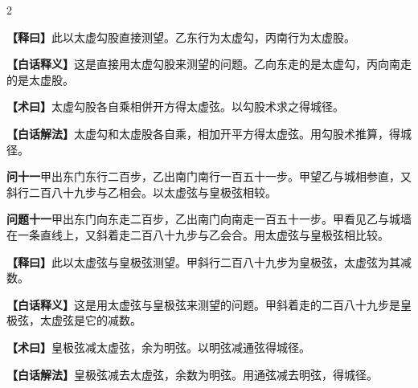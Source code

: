 \documentclass[11pt,a4paper]{article}
\newcommand{\WenQuestion}[1]{\textbf{\textcolor{classicalcolor}{#1}}}
\newcommand{\BaiQuestion}[1]{\textbf{\textcolor{moderncolor}{#1}}}
\newcommand{\WenExplain}{\textcolor{classicalcolor}{\textbf{【释曰】}}}
\newcommand{\BaiExplain}{\textcolor{moderncolor}{\textbf{【白话释义】}}}
\newcommand{\WenMethod}{\textcolor{classicalcolor}{\textbf{【术曰】}}}
\newcommand{\BaiMethod}{\textcolor{moderncolor}{\textbf{【白话解法】}}}
\begin{document}
\begin{paracol}{2}
\switchcolumn*
\begin{tcolorbox}[colback=red!5,colframe=red!30!black,boxrule=0.3pt]
\WenExplain\quad 此以太虚勾股直接测望。乙东行为太虚勾，丙南行为太虚股。
\end{tcolorbox}
\switchcolumn
\begin{tcolorbox}[colback=blue!5,colframe=blue!30!black,boxrule=0.3pt]
\BaiExplain\quad 这是直接用太虚勾股来测望的问题。乙向东走的是太虚勾，丙向南走的是太虚股。
\end{tcolorbox}

\switchcolumn*
\begin{tcolorbox}[colback=red!5,colframe=red!40!black,boxrule=0.3pt]
\WenMethod\quad 太虚勾股各自乘相併开方得太虚弦。以勾股术求之得城径。
\end{tcolorbox}
\switchcolumn
\begin{tcolorbox}[colback=blue!5,colframe=blue!40!black,boxrule=0.3pt]
\BaiMethod\quad 太虚勾和太虚股各自乘，相加开平方得太虚弦。用勾股术推算，得城径。
\end{tcolorbox}

\vspace{0.8em}

\switchcolumn*
\begin{tcolorbox}[colback=red!3,colframe=red!30!black,boxrule=0.3pt]
\WenQuestion{问十一}\quad 甲出东门东行二百步，乙出南门南行一百五十一步。甲望乙与城相参直，又斜行二百八十九步与乙相会。以太虚弦与皇极弦相较。
\end{tcolorbox}
\switchcolumn
\begin{tcolorbox}[colback=blue!3,colframe=blue!30!black,boxrule=0.3pt]
\BaiQuestion{问题十一}\quad 甲出东门向东走二百步，乙出南门向南走一百五十一步。甲看见乙与城墙在一条直线上，又斜着走二百八十九步与乙会合。用太虚弦与皇极弦相比较。
\end{tcolorbox}

\switchcolumn*
\begin{tcolorbox}[colback=red!5,colframe=red!30!black,boxrule=0.3pt]
\WenExplain\quad 此以太虚弦与皇极弦测望。甲斜行二百八十九步为皇极弦，太虚弦为其减数。
\end{tcolorbox}
\switchcolumn
\begin{tcolorbox}[colback=blue!5,colframe=blue!30!black,boxrule=0.3pt]
\BaiExplain\quad 这是用太虚弦与皇极弦来测望的问题。甲斜着走的二百八十九步是皇极弦，太虚弦是它的减数。
\end{tcolorbox}

\switchcolumn*
\begin{tcolorbox}[colback=red!5,colframe=red!40!black,boxrule=0.3pt]
\WenMethod\quad 皇极弦减太虚弦，余为明弦。以明弦减通弦得城径。
\end{tcolorbox}
\switchcolumn
\begin{tcolorbox}[colback=blue!5,colframe=blue!40!black,boxrule=0.3pt]
\BaiMethod\quad 皇极弦减去太虚弦，余数为明弦。用通弦减去明弦，得城径。
\end{tcolorbox}


\end{paracol}
\end{document}
